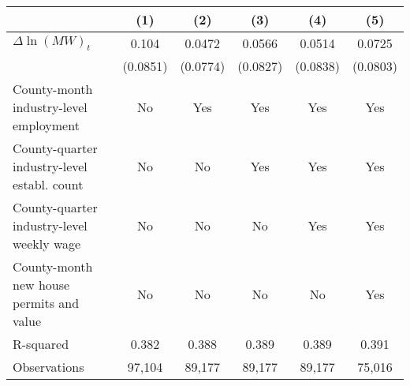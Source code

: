 {
\def\sym#1{\ifmmode^{#1}\else\(^{#1}\)\fi}
\begin{tabular}{l*{5}{c}}
\hline\hline
          &\multicolumn{1}{c}{(1)}         &\multicolumn{1}{c}{(2)}         &\multicolumn{1}{c}{(3)}         &\multicolumn{1}{c}{(4)}         &\multicolumn{1}{c}{(5)}         \\
\hline
$\Delta \ln(MW)_{t}$&    0.104         &   0.0472         &   0.0566         &   0.0514         &   0.0725         \\
          & (0.0851)         & (0.0774)         & (0.0827)         & (0.0838)         & (0.0803)         \\
\hline
County-month industry-level employment&       No         &      Yes         &      Yes         &      Yes         &      Yes         \\
County-quarter industry-level establ. count&       No         &       No         &      Yes         &      Yes         &      Yes         \\
County-quarter industry-level weekly wage&       No         &       No         &       No         &      Yes         &      Yes         \\
County-month new house permits and value&       No         &       No         &       No         &       No         &      Yes         \\
R-squared &    0.382         &    0.388         &    0.389         &    0.389         &    0.391         \\
Observations&   97,104         &   89,177         &   89,177         &   89,177         &   75,016         \\
\hline\hline
\end{tabular}
}
